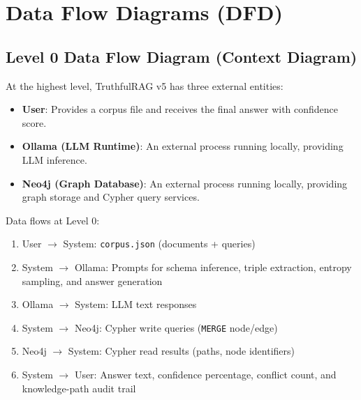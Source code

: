 \section{Data Flow Diagrams (DFD)}

\subsection{Level 0 Data Flow Diagram (Context Diagram)}

At the highest level, TruthfulRAG v5 has three external entities:

\begin{itemize}
    \item \textbf{User}: Provides a corpus file and receives the final answer
    with confidence score.
    \item \textbf{Ollama (LLM Runtime)}: An external process running locally,
    providing LLM inference.
    \item \textbf{Neo4j (Graph Database)}: An external process running locally,
    providing graph storage and Cypher query services.
\end{itemize}

Data flows at Level 0:
\begin{enumerate}
    \item User $\rightarrow$ System: \texttt{corpus.json} (documents + queries)
    \item System $\rightarrow$ Ollama: Prompts for schema inference, triple extraction,
    entropy sampling, and answer generation
    \item Ollama $\rightarrow$ System: LLM text responses
    \item System $\rightarrow$ Neo4j: Cypher write queries (\texttt{MERGE} node/edge)
    \item Neo4j $\rightarrow$ System: Cypher read results (paths, node identifiers)
    \item System $\rightarrow$ User: Answer text, confidence percentage, conflict count,
    and knowledge-path audit trail
\end{enumerate}

